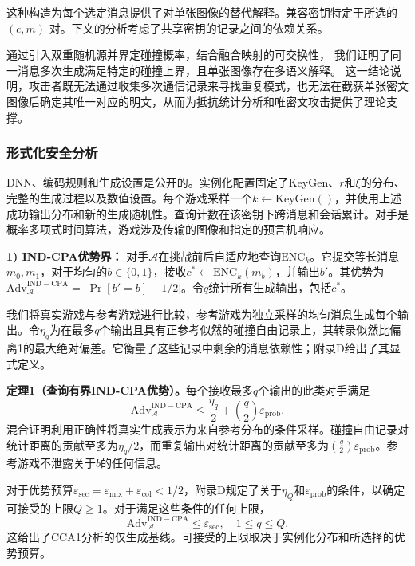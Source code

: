 这种构造为每个选定消息提供了对单张图像的替代解释。兼容密钥特定于所选的 \((c, m)\) 对。下文的分析考虑了共享密钥的记录之间的依赖关系。

通过引入双重随机源并界定碰撞概率，结合融合映射的可交换性，
我们证明了同一消息多次生成满足特定的碰撞上界，且单张图像存在多语义解释。
这一结论说明，攻击者既无法通过收集多次通信记录来寻找重复模式，也无法在截获单张密文图像后确定其唯一对应的明文，从而为抵抗统计分析和唯密文攻击提供了理论支撑。
\subsubsection{形式化安全分析}

DNN、编码规则和生成设置是公开的。实例化配置固定了KeyGen、\(r\)和\(\xi\)的分布、完整的生成过程以及数值设置。每个游戏采样一个\(k \leftarrow \mathrm{KeyGen}()\)，并使用上述成功输出分布和新的生成随机性。查询计数在该密钥下跨消息和会话累计。对手是概率多项式时间算法，游戏涉及传输的图像和指定的预言机响应。

\textbf{1) IND-CPA优势界：} 对手\(\mathcal{A}\)在挑战前后自适应地查询\(\mathrm{ENC}_k\)。它提交等长消息\(m_0, m_1\)，对于均匀的\(b \in \{0,1\}\)，接收\(c^* \leftarrow \mathrm{ENC}_k(m_b)\)，并输出\(b'\)。其优势为\(\mathrm{Adv}_{\mathcal{A}}^{\mathrm{IND-CPA}} = |\Pr[b' = b] - 1/2|\)。令\(q\)统计所有生成输出，包括\(c^*\)。

我们将真实游戏与参考游戏进行比较，参考游戏为独立采样的均匀消息生成每个输出。令\(\eta_q\)为在最多\(q\)个输出且具有正参考似然的碰撞自由记录上，其转录似然比偏离1的最大绝对偏差。它衡量了这些记录中剩余的消息依赖性；附录D给出了其显式定义。

\textbf{定理1（查询有界IND-CPA优势）。}每个接收最多\(q\)个输出的此类对手满足
\begin{equation}
\mathrm{Adv}_{\mathcal{A}}^{\mathrm{IND-CPA}} \le \frac{\eta_q}{2} + \binom{q}{2} \varepsilon_{\mathrm{prob}}. \tag{17}
\end{equation}
混合证明利用正确性将真实生成表示为来自参考分布的条件采样。碰撞自由记录对统计距离的贡献至多为\(\eta_q/2\)，而重复输出对统计距离的贡献至多为\(\binom{q}{2}\varepsilon_{\mathrm{prob}}\)。参考游戏不泄露关于\(b\)的任何信息。

对于优势预算\(\varepsilon_{\mathrm{sec}} = \varepsilon_{\mathrm{mix}} + \varepsilon_{\mathrm{col}} < 1/2\)，附录D规定了关于\(\eta_Q\)和\(\varepsilon_{\mathrm{prob}}\)的条件，以确定可接受的上限\(Q \ge 1\)。对于满足这些条件的任何上限，
\begin{equation}
\mathrm{Adv}_{\mathcal{A}}^{\mathrm{IND-CPA}} \le \varepsilon_{\mathrm{sec}}, \quad 1 \le q \le Q. \tag{18}
\end{equation}
这给出了CCA1分析的仅生成基线。可接受的上限取决于实例化分布和所选择的优势预算。

